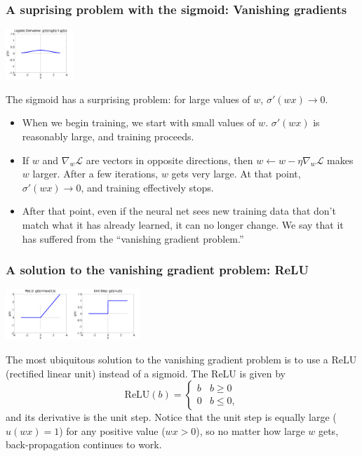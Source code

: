 \documentclass{beamer}
\begin{document}
\begin{frame}
  \frametitle{A suprising problem with the sigmoid: Vanishing gradients}
  \centerline{\includegraphics[width=1in]{../lec07/figs/nn_logisticprime.png}}
  
  The sigmoid has a surprising problem: for large values of $w$,
  $\sigma'(wx)\rightarrow 0$.
  \begin{itemize}
  \item When we begin training, we start with small values of $w$.
    $\sigma'(wx)$ is reasonably large, and training proceeds.
  \item If $w$ and $\nabla_{w}{\mathcal L}$ are vectors in opposite
    directions, then $w\leftarrow w-\eta\nabla_{w}{\mathcal L}$ makes
    $w$ larger.  After a few iterations, $w$ gets very large.  At that
    point, $\sigma'(wx)\rightarrow 0$, and training effectively stops.
  \item After that point, even if the neural net sees new training
    data that don't match what it has already learned, it can no
    longer change.  We say that it has suffered from the ``vanishing
    gradient problem.''
  \end{itemize}
\end{frame}
    
\begin{frame}
  \frametitle{A solution to the vanishing gradient problem: ReLU}
  \centerline{\includegraphics[width=1in]{../lec07/figs/nn_relu.png}\includegraphics[width=1in]{../lec07/figs/nn_unitstep.png}}

  The most ubiquitous solution to the vanishing gradient problem is to
  use a ReLU (rectified linear unit) instead of a sigmoid.  The ReLU
  is given by
  \[
  \mbox{ReLU}(b) = \begin{cases}
    b & b\ge 0\\
    0 & b\le 0,
  \end{cases}
  \]
  and its derivative is the unit step.  Notice that the
  unit step is equally large ($u(wx)=1$)  for any positive value ($wx>0$), so
  no matter how large $w$ gets, back-propagation continues to work.
\end{frame}
\end{document}
